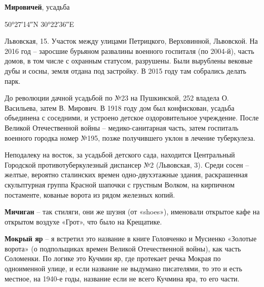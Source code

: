 

\textbf{Мировичей}, усадьба

50°27′14″N 30°22′36″E

Львовская, 15. Участок между улицами Петрицкого, Верховинной, Львовской. На 2016 год – заросшие бурьяном развалины военного госпиталя (по 2004-й), часть домов, в том числе с охранным статусом, разрушены. Были вырублены вековые дубы и сосны, земля отдана под застройку. В 2015 году там собрались делать парк.

До революции дачной усадьбой по №23 на Пушкинской, 252 владела О. Васильева, затем В. Мирович. В 1918 году дом был конфискован, усадьба объединена с соседними, и устроено детское оздоровительное учреждение. После Великой Отечественной войны – медико-санитарная часть, затем госпиталь военного городка номер №195, позже получившего уклон в лечение туберкулеза.

Неподалеку на восток, за усадьбой детского сада, находится Центральный Городской противотуберкулезный диспансер №2 (Львовская, 3). Среди сосен – желтые, вероятно сталинских времен одно-двухэтажные здания, раскрашенная скульптурная группа Красной шапочки с грустным Волком, на кирпичном постаменте, кованые ворота из рядом железных копий.\\

\medskip


\textbf{Мичиган} – так стиляги, они же шузня (от «shoes»), именовали открытое кафе на открытом воздухе «Грот», что было на Крещатике.\\

\medskip



\textbf{Мокрый яр} – я встретил это название в книге Головченко и Мусиенко «Золотые ворота» (о подпольщиках времен Великой Отечественной войны), как часть Соломенки. По логике это Кучмин яр, где протекает речка Мокрая по одноименной улице, и если название не выдумано писателями, то это и есть местное, на 1940-е годы, название если не всего Кучмина яра, то его части.\\

